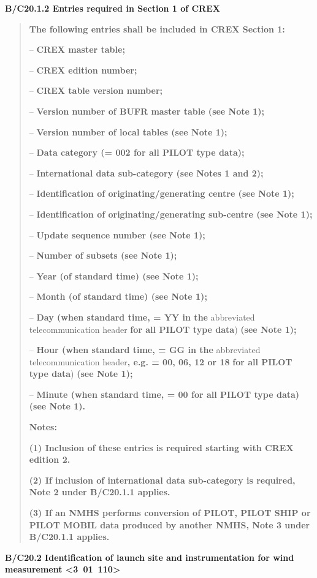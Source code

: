 \textbf{B/C20.1.2 Entries required in Section 1 of CREX}

\begin{quote}
\textbf{The following entries shall be included in CREX Section 1:}

-- \textbf{CREX master table;}

-- \textbf{CREX edition number;}

-- \textbf{CREX table version number;}

-- \textbf{Version number of BUFR master table (see Note 1);}

-- \textbf{Version number of local tables (see Note 1);}

-- \textbf{Data category (= 002 for all PILOT type data);}

-- \textbf{International data sub-category (see Notes 1 and 2);}

-- \textbf{Identification of originating/generating centre (see Note 1);}

-- \textbf{Identification of originating/generating sub-centre (see Note 1);}

-- \textbf{Update sequence number (see Note 1);}

-- \textbf{Number of subsets (see Note 1);}

-- \textbf{Year (of standard time) (see Note 1);}

-- \textbf{Month (of standard time) (see Note 1);}

-- \textbf{Day (when standard time, = YY in the} abbreviated telecommunication header \textbf{for all PILOT type data}) \textbf{(see Note 1);}

-- \textbf{Hour (when standard time, = GG in the} abbreviated telecommunication header\textbf{, e.g. = 00, 06, 12 or 18} \textbf{for all PILOT type data}) \textbf{(see Note 1);}

-- \textbf{Minute (when standard time, = 00 for all PILOT type data) (see Note 1).}

\textbf{Notes:}

\textbf{(1) Inclusion of these entries is required starting with CREX edition 2.}

\textbf{(2) If inclusion of international data sub-category is required, Note 2 under B/C20.1.1 applies.}

\textbf{(3) If an NMHS performs conversion of PILOT, PILOT SHIP or PILOT MOBIL data produced by another NMHS, Note 3 under B/C20.1.1 applies.}
\end{quote}

\textbf{B/C20.2 Identification of launch site and instrumentation for wind measurement \textless3~01~110\textgreater{}}

